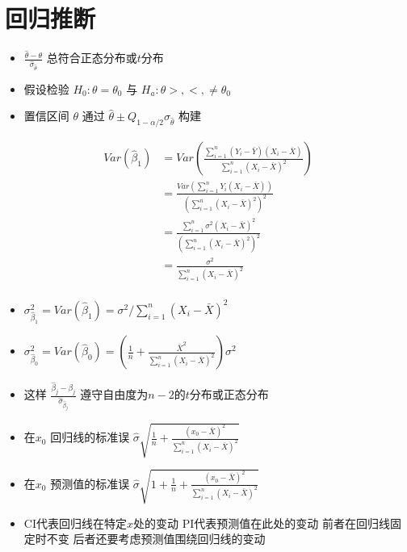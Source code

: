 \documentclass[]{book}
\providecommand{\tightlist}{%
  \setlength{\itemsep}{0pt}\setlength{\parskip}{0pt}}
\begin{document}
\hypertarget{ux56deux5f52ux63a8ux65ad}{%
\section{回归推断}\label{ux56deux5f52ux63a8ux65ad}}

\begin{itemize}
\tightlist
\item
  \(\frac{\hat \theta - \theta}{\hat \sigma_{\hat \theta}}\) 总符合正态分布或\(t\)分布
\item
  假设检验 \(H_0 : \theta = \theta_0\) 与 \(H_a : \theta >, <, \neq \theta_0\)
\item
  置信区间 \(\theta\) 通过 \(\hat \theta \pm Q_{1-\alpha/2} \hat \sigma_{\hat \theta}\) 构建
\end{itemize}

\begin{align}
Var(\hat \beta_1) & =
Var\left(\frac{\sum_{i=1}^n (Y_i - \bar Y) (X_i - \bar X)}{\sum_{i=1}^n (X_i - \bar X)^2}\right) \\
& = \frac{Var\left(\sum_{i=1}^n Y_i (X_i - \bar X) \right) }{\left(\sum_{i=1}^n (X_i - \bar X)^2 \right)^2} \\
& = \frac{\sum_{i=1}^n \sigma^2(X_i - \bar X)^2}{\left(\sum_{i=1}^n (X_i - \bar X)^2 \right)^2} \\
& = \frac{\sigma^2}{\sum_{i=1}^n (X_i - \bar X)^2} \\
\end{align}

\begin{itemize}
\tightlist
\item
  \(\sigma_{\hat \beta_1}^2 = Var(\hat \beta_1) = \sigma^2 / \sum_{i=1}^n (X_i - \bar X)^2\)
\item
  \(\sigma_{\hat \beta_0}^2 = Var(\hat \beta_0) = \left(\frac{1}{n} + \frac{\bar X^2}{\sum_{i=1}^n (X_i - \bar X)^2 }\right)\sigma^2\)
\item
  这样 \(\frac{\hat \beta_j - \beta_j}{\hat \sigma_{\hat \beta_j}}\) 遵守自由度为\(n-2\)的\(t\)分布或正态分布
\item
  在\(x_0\) 回归线的标准误 \(\hat \sigma\sqrt{\frac{1}{n} + \frac{(x_0 - \bar X)^2}{\sum_{i=1}^n (X_i - \bar X)^2}}\)
\item
  在\(x_0\) 预测值的标准误 \(\hat \sigma\sqrt{1 + \frac{1}{n} + \frac{(x_0 - \bar X)^2}{\sum_{i=1}^n (X_i - \bar X)^2}}\)
\item
  CI代表回归线在特定\(x\)处的变动 PI代表预测值在此处的变动 前者在回归线固定时不变 后者还要考虑预测值围绕回归线的变动
\end{itemize}
\end{document}
